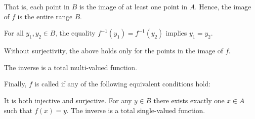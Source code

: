 \begin{definition}
\begin{thmenum}
\begin{minipage}[t]{0.44\textwidth}
\begin{thmenum}[leftmargin=0.9cm]
        That is, each point in \( B \) is the image of at least one point in \( A \). Hence, the image of \( f \) is the entire range \( B \).

         For all \( y_1, y_2 \in B \), the equality \( f^{-1}(y_1) = f^{-1}(y_2) \) implies \( y_1 = y_2 \).

        Without surjectivity, the above holds only for the points in the image of \( f \).

         The inverse is a total multi-valued function.
      \end{thmenum}
    \end{minipage}

     Finally, \( f \) is called  if any of the following equivalent conditions hold:
    \begin{thmenum}
       It is both injective and surjective.
       For any \( y \in B \) there exists exactly one \( x \in A \) such that \( f(x) = y \).
       The inverse is a total single-valued function.
    \end{thmenum}
  \end{thmenum}
\end{definition}

